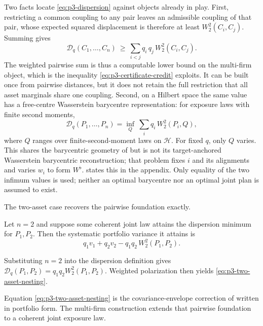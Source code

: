 Two facts locate \eqref{eq:p3-dispersion} against objects already in play.
First, restricting a common coupling to any pair leaves an admissible coupling
of that pair, whose expected squared displacement is therefore at least
$W_2^2(C_i,C_j)$. Summing gives
\begin{equation}\label{eq:p3-pairwise-relaxation}
  \mathcal D_q(C_1,\dots,C_n)
  \ \ge\ \sum_{i<j}q_i\,q_j\,W_2^2(C_i,C_j).
\end{equation}
The weighted pairwise sum is thus a computable lower bound on the multi-firm
object, which is the inequality \eqref{eq:p3-certificate-credit} exploits.
It can be built once from pairwise distances, but it does not retain the full
restriction that all asset marginals share one coupling.
Second, on a Hilbert space the same value has a free-centre Wasserstein
barycentre representation: for exposure laws with finite second moments,
\begin{equation}\label{eq:p3-barycenter-representation}
  \mathcal D_q(P_1,\dots,P_n)
  =\inf_{Q}\ \sum_i q_i\,W_2^2(P_i,Q),
\end{equation}
where $Q$ ranges over finite-second-moment laws on $\mathcal H$.
For fixed $q$, only $Q$ varies.
This shares the barycentric geometry of
\citet{gawronsky_spatial_2027} but is not
its target-anchored Wasserstein barycentric reconstruction; that problem fixes
$i$ and its alignments and varies $w_i$ to form $W^\flat$.
 states this in the appendix. Only
equality of the two infimum values is used; neither an optimal barycentre nor
an optimal joint plan is assumed to exist.

The two-asset case recovers the pairwise foundation exactly.

\begin{proposition}\label{thm:p3-pairwise-bridge}
  Let $n=2$ and suppose some coherent joint law attains the dispersion minimum
  for $P_1,P_2$. Then the systematic portfolio variance it attains is
  \begin{equation}\label{eq:p3-two-asset-nesting}
    q_1v_1+q_2v_2-q_1q_2\,W_2^2(P_1,P_2).
  \end{equation}
\end{proposition}
Substituting $n=2$ into the dispersion definition gives
$\mathcal D_q(P_1,P_2)=q_1q_2W_2^2(P_1,P_2)$.
Weighted polarization then yields \eqref{eq:p3-two-asset-nesting}.

Equation \eqref{eq:p3-two-asset-nesting} is the covariance-envelope correction
of \citet{gawronsky_continuous_2026} written in portfolio form.
The multi-firm construction extends that pairwise foundation to a coherent
joint exposure law.

